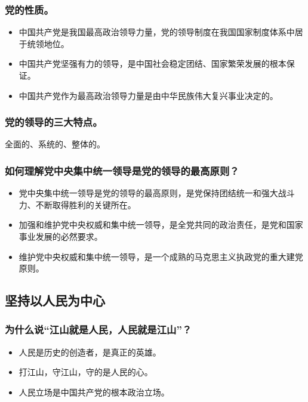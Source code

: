 \documentclass{article}
\begin{document}
\subsubsection{党的性质。}
\begin{itemize}
    \item 中国共产党是我国最高政治领导力量，党的领导制度在我国国家制度体系中居于统领地位。
    \item 中国共产党坚强有力的领导，是中国社会稳定团结、国家繁荣发展的根本保证。
    \item 中国共产党作为最高政治领导力量是由中华民族伟大复兴事业决定的。
\end{itemize}

\subsubsection{党的领导的三大特点。}
全面的、系统的、整体的。

\subsubsection{如何理解党中央集中统一领导是党的领导的最高原则？}
\begin{itemize}
    \item 党中央集中统一领导是党的领导的最高原则，是党保持团结统一和强大战斗力、不断取得胜利的关键所在。
    \item 加强和维护党中央权威和集中统一领导，是全党共同的政治责任，是党和国家事业发展的必然要求。
    \item 维护党中央权威和集中统一领导，是一个成熟的马克思主义执政党的重大建党原则。
\end{itemize}

\subsection{坚持以人民为中心}

\subsubsection{为什么说“江山就是人民，人民就是江山”？}
\begin{itemize}
    \item 人民是历史的创造者，是真正的英雄。
    \item 打江山，守江山，守的是人民的心。
    \item 人民立场是中国共产党的根本政治立场。
\end{itemize}
\end{document}
